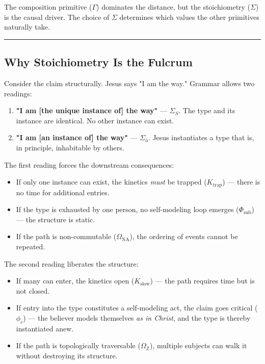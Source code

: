 \documentclass[12pt,a4paper]{article}
\begin{document}
The composition primitive ($\Gamma$) dominates the distance, but the stoichiometry ($\Sigma$) is the causal driver. The choice of $\Sigma$ determines which values the other primitives naturally take.

\begin{center}
\rule{0.5\textwidth}{0.4pt}
\end{center}

\subsection{Why Stoichiometry Is the Fulcrum}

Consider the claim structurally. Jesus says "I am the way." Grammar allows two readings:

\begin{enumerate}
    \item \textbf{"I am {[}the unique instance of{]} the way"} --- $\Sigma_S$. The type and its instance are identical. No other instance can exist.
    \item \textbf{"I am {[}an instance of{]} the way"} --- $\Sigma_ő$. Jesus instantiates a type that is, in principle, inhabitable by others.
\end{enumerate}

The first reading forces the downstream consequences:

\begin{itemize}
    \item If only one instance can exist, the kinetics \emph{must} be trapped ($K_\text{trap}$) --- there is no time for additional entries.
    \item If the type is exhausted by one person, no self-modeling loop emerges ($\Phi_\text{sub}$) --- the structure is static.
    \item If the path is non-commutable ($\Omega_\text{NA}$), the ordering of events cannot be repeated.
\end{itemize}

The second reading liberates the structure:

\begin{itemize}
    \item If many can enter, the kinetics open ($K_\text{slow}$) --- the path requires time but is not closed.
    \item If entry into the type constitutes a self-modeling act, the claim goes critical ($\phi_c$) --- the believer models themselves \emph{as in Christ}, and the type is thereby instantiated anew.
    \item If the path is topologically traversable ($\Omega_\mathbb{Z}$), multiple subjects can walk it without destroying its structure.
\end{itemize}
\end{document}
